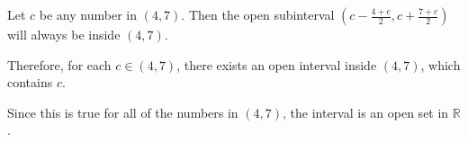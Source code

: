 \documentclass{ximera}
\begin{document}
\begin{example}
\begin{image}
  \end{image}






Let $c$ be any number in $(4,7)$.  Then the open subinterval $\left( c - \frac{4+c}{2}, c + \frac{7+c}{2} \right)$ will always be inside $(4,7)$.

Therefore, for each $c \in (4, 7)$, there exists an open interval inside $(4,7)$, which contains $c$.

Since this is true for all of the numbers in $(4,7)$, the interval is an open set in $\mathbb{R}$.


\end{example}
\end{document}
